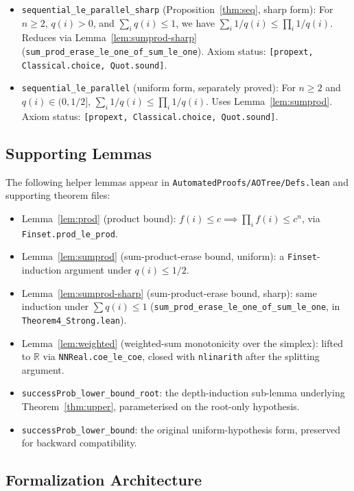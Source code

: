 \documentclass[reqno,11pt]{amsart}
\newcommand{\RR}{\mathbb{R}}
\newcommand{\lean}[1]{\textup{\texttt{\small #1}}}
\theoremstyle{plain}
\theoremstyle{definition}
\theoremstyle{remark}
\begin{document}
\begin{itemize}[leftmargin=*, itemsep=4pt]
\item \lean{sequential\_le\_parallel\_sharp} (Proposition~\ref{thm:seq}, sharp form): For $n \ge 2$, $q(i) > 0$, and $\sum_i q(i) \le 1$, we have $\sum_i 1/q(i) \le \prod_i 1/q(i)$. Reduces via Lemma~\ref{lem:sumprod-sharp} (\lean{sum\_prod\_erase\_le\_one\_of\_sum\_le\_one}).
  Axiom status: \texttt{[propext, Classical.choice, Quot.sound]}.

\item \lean{sequential\_le\_parallel} (uniform form, separately proved): For $n \ge 2$ and $q(i) \in (0, 1/2]$, $\sum_i 1/q(i) \le \prod_i 1/q(i)$. Uses Lemma~\ref{lem:sumprod}.
  Axiom status: \texttt{[propext, Classical.choice, Quot.sound]}.
\end{itemize}

\subsection*{Supporting Lemmas}

The following helper lemmas appear in \texttt{AutomatedProofs/AOTree/Defs.lean} and supporting theorem files:
\begin{itemize}[leftmargin=*, itemsep=4pt]
\item Lemma~\ref{lem:prod} (product bound): $f(i) \le c \implies \prod_i f(i) \le c^n$, via \texttt{Finset.prod\_le\_prod}.
\item Lemma~\ref{lem:sumprod} (sum-product-erase bound, uniform): a \texttt{Finset}-induction argument under $q(i) \le 1/2$.
\item Lemma~\ref{lem:sumprod-sharp} (sum-product-erase bound, sharp): same induction under $\sum q(i) \le 1$ (\lean{sum\_prod\_erase\_le\_one\_of\_sum\_le\_one}, in \texttt{Theorem4\_Strong.lean}).
\item Lemma~\ref{lem:weighted} (weighted-sum monotonicity over the simplex): lifted to $\RR$ via \texttt{NNReal.coe\_le\_coe}, closed with \texttt{nlinarith} after the splitting argument.
\item \lean{successProb\_lower\_bound\_root}: the depth-induction sub-lemma underlying Theorem~\ref{thm:upper}, parameterised on the root-only hypothesis.
\item \lean{successProb\_lower\_bound}: the original uniform-hypothesis form, preserved for backward compatibility.
\end{itemize}

\subsection*{Formalization Architecture}
\end{document}
